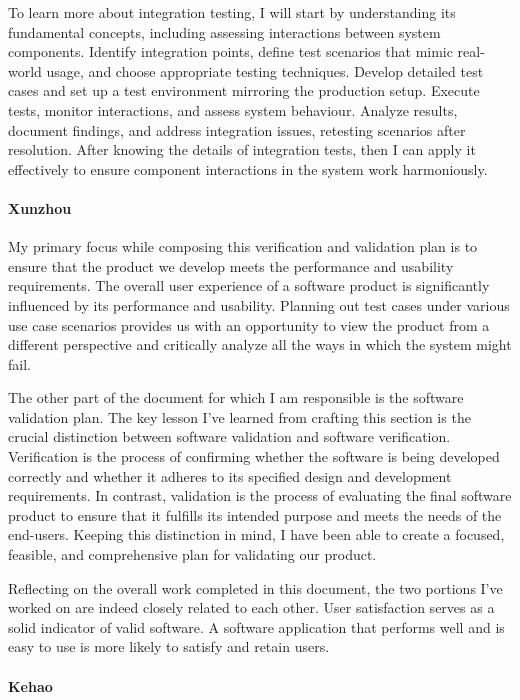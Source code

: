 \documentclass[12pt, titlepage]{article}
\begin{document}
To learn more about integration testing, I will start by understanding its
fundamental concepts, including assessing interactions between system
components. Identify integration points, define test scenarios that mimic
real-world usage, and choose appropriate testing techniques. Develop detailed
test cases and set up a test environment mirroring the production setup. Execute
tests, monitor interactions, and assess system behaviour. Analyze results,
document findings, and address integration issues, retesting scenarios after
resolution. After knowing the details of integration tests, then I can apply it
effectively to ensure component interactions in the system work harmoniously.

\paragraph*{Xunzhou}
My primary focus while composing this verification and validation plan is to
ensure that the product we develop meets the performance and usability
requirements. The overall user experience of a software product is significantly
influenced by its performance and usability. Planning out test cases under
various use case scenarios provides us with an opportunity to view the product
from a different perspective and critically analyze all the ways in which the
system might fail.

The other part of the document for which I am responsible is the software
validation plan. The key lesson I've learned from crafting this section is the
crucial distinction between software validation and software verification.
Verification is the process of confirming whether the software is being
developed correctly and whether it adheres to its specified design and
development requirements. In contrast, validation is the process of evaluating
the final software product to ensure that it fulfills its intended purpose and
meets the needs of the end-users. Keeping this distinction in mind, I have been
able to create a focused, feasible, and comprehensive plan for validating our
product.

Reflecting on the overall work completed in this document, the two portions I've
worked on are indeed closely related to each other. User satisfaction serves as
a solid indicator of valid software. A software application that performs well
and is easy to use is more likely to satisfy and retain users.

\paragraph*{Kehao}
\end{document}
